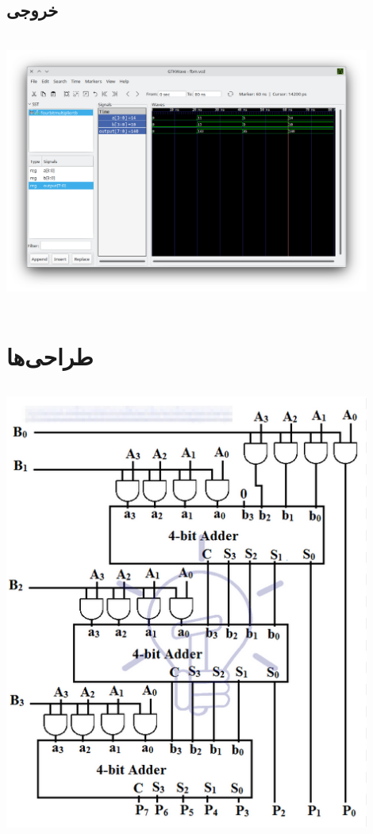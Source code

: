 \documentclass[dvipsnames, svgnames, x11names, a4paper, 11pt, oneside]{book}
\begin{document}
				\subsection{خروجی }
					\begin{center}
						\includegraphics[width=12cm, height=9cm]{./images/four_bit_mul_vcd}
					\end{center}
				
			\section{طراحی‌ها}
				\begin{center}
					\includegraphics[width=12cm, height=15cm]{./images/mul}
				\end{center}
		
\end{document}
